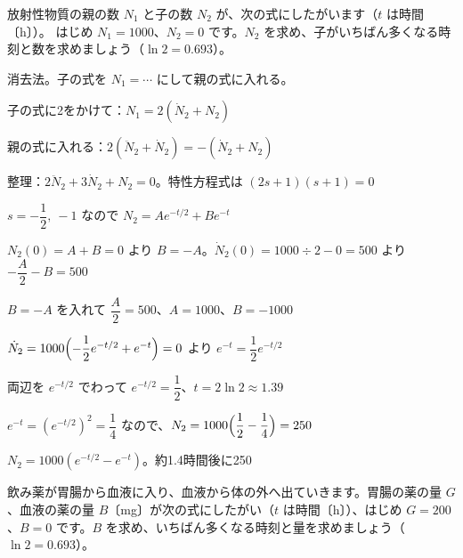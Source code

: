 \begin{reidai}[親と子]
放射性物質の親の数 $N_1$ と子の数 $N_2$ が、次の式にしたがいます（$t$ は時間〔h〕）。
はじめ $N_1=1000$、$N_2=0$ です。$N_2$ を求め、子がいちばん多くなる時刻と数を求めましょう（$\ln2=0.693$）。\par
\kangaekata 消去法。子の式を $N_1=\cdots$ にして親の式に入れる。\par
\shiki\kvios{}\zw{} 子の式に2をかけて：$N_1=2(\dot N_2+N_2)$\par
\kvioa 親の式に入れる：$2(\ddot N_2+\dot N_2)=-(\dot N_2+N_2)$\par
\kvioa 整理：$2\ddot N_2+3\dot N_2+N_2=0$。特性方程式は $(2s+1)(s+1)=0$\par
\kviob $s=-\dfrac12,\ -1$ なので $N_2=Ae^{-t/2}+Be^{-t}$\par
\kvioa $N_2(0)=A+B=0$ より $B=-A$。$\dot N_2(0)=1000\div2-0=500$ より $-\dfrac{A}{2}-B=500$\par
\kviob $B=-A$ を入れて $\dfrac{A}{2}=500$、$A=1000$、$B=-1000$\par
\kvioa $\dot N_2=1000\Bigl(-\dfrac12e^{-t/2}+e^{-t}\Bigr)=0$ より $e^{-t}=\dfrac12e^{-t/2}$\par
\kviob 両辺を $e^{-t/2}$ でわって $e^{-t/2}=\dfrac12$、$t=2\ln2\approx1.39$\par
\kviob $e^{-t}=(e^{-t/2})^2=\dfrac14$ なので、$N_2=1000\Bigl(\dfrac12-\dfrac14\Bigr)=250$\par
\kotae\kvios{}\zw{} $N_2=1000(e^{-t/2}-e^{-t})$。約1.4時間後に250
\end{reidai}

\begin{jibun}
飲み薬が胃腸から血液に入り、血液から体の外へ出ていきます。胃腸の薬の量 $G$、血液の薬の量 $B$〔mg〕が次の式にしたがい（$t$ は時間〔h〕）、はじめ $G=200$、$B=0$ です。$B$ を求め、いちばん多くなる時刻と量を求めましょう（$\ln2=0.693$）。
\end{jibun}


